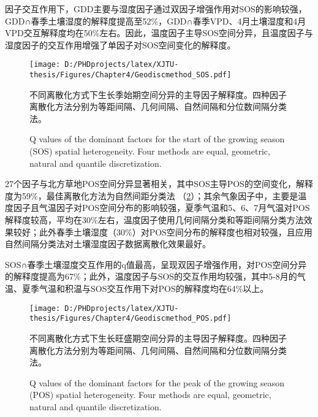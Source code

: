 因子交互作用下，GDD主要与湿度因子通过双因子增强作用对SOS的影响较强，GDD∩春季土壤湿度的解释度提高至52\%，GDD∩春季VPD、4月土壤湿度和4月VPD交互解释度均在50\%左右。因此，温度因子主导SOS空间分异，且温度因子与湿度因子的交互作用增强了单因子对SOS空间变化的解释度。

\renewcommand{\dblfloatpagefraction}{.8}
\begin{figure}[ht]
  \centering
  \setlength\abovedisplayskip{0pt}
  \texttt{[image: D:/PHDprojects/latex/XJTU-thesis/Figures/Chapter4/Geodiscmethod\_SOS.pdf]}
  \caption{不同离散化方式下生长季始期空间分异的主导因子解释度。四种因子离散化方法分别为等距间隔、几何间隔、自然间隔和分位数间隔分类法。}
  \addtocounter{figure}{-1}
  \vspace{5pt}
  \renewcommand{\figurename}{Fig}
  \caption{Q values of the dominant factors for the start of the growing season (SOS) spatial heterogeneity. Four methods are equal, geometric, natural and quantile discretization. }
  \label{C4:3}
\end{figure}

27个因子与北方草地POS空间分异显著相关，其中SOS主导POS的空间变化，解释度为59\%，最佳离散化方法为自然间距分类法 （\cref{C4:4}）；其余气象因子中，主要是温度因子且气温因子对POS空间分布的影响较强，夏季气温和5、6、7月气温对POS解释度较高，平均在30\%左右，温度因子使用几何间隔分类和等距间隔分类方法效果较好；此外春季土壤湿度（30\%）对POS空间分布的解释度也相对较强，且应用自然间隔分类法对土壤湿度因子数据离散化效果最好。

SOS∩春季土壤湿度交互作用的q值最高，呈现双因子增强作用，对POS空间分异的解释度提高为67\%；此外，温度因子与SOS的交互作用均较强，其中5-8月的气温、夏季气温和积温与SOS交互作用下对POS的解释度均在64\%以上。

\renewcommand{\dblfloatpagefraction}{.8}
\begin{figure}[ht]
  \centering
  \setlength\abovedisplayskip{0pt}
  \texttt{[image: D:/PHDprojects/latex/XJTU-thesis/Figures/Chapter4/Geodiscmethod\_POS.pdf]}
  \caption{不同离散化方式下生长旺盛期空间分异的主导因子解释度。四种因子离散化方法分别为等距间隔、几何间隔、自然间隔和分位数间隔分类法。}
  \addtocounter{figure}{-1}
  \vspace{5pt}
  \renewcommand{\figurename}{Fig}
  \caption{Q values of the dominant factors for the peak of the growing season (POS) spatial heterogeneity. Four methods are equal, geometric, natural and quantile discretization. }
  \label{C4:4}
\end{figure}

